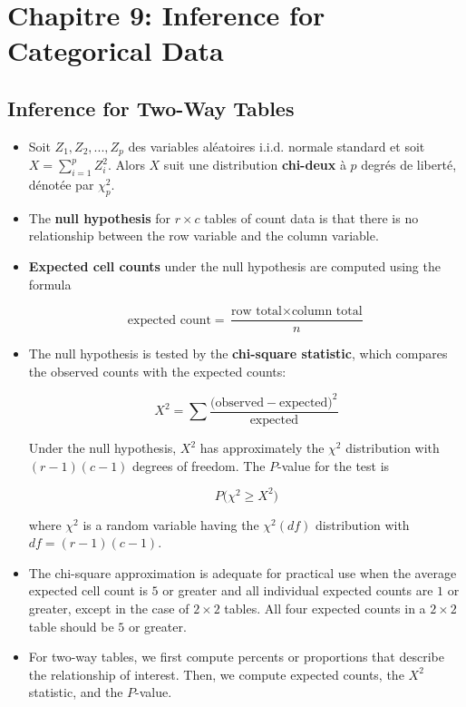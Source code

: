 \section{Chapitre 9: Inference for Categorical Data}
	\subsection{Inference for Two-Way Tables}
		\begin{itemize}
			\item Soit $Z_1,Z_2,...,Z_p$ des variables aléatoires i.i.d. normale standard et soit $X=\sum_{i=1}^{p}Z^2_i$. Alors $X$ suit une distribution \textbf{chi-deux} à $p$ degrés de liberté, dénotée par $\chi^2_p$.
			\item The \textbf{null hypothesis} for $r\times c$ tables of count data is that there is no relationship between the row variable and the column variable.
			
			\item \textbf{Expected cell counts} under the null hypothesis are computed using the formula
			
			\[\text{expected count} = \frac{\text{row total}\times\text{column total}}{n}\]
			
			\item The null hypothesis is tested by the \textbf{chi-square statistic}, which compares the observed counts with the expected counts:
			
			\[X^2=\sum \frac{\big(\text{observed}-\text{expected}\big)^2}{\text{expected}}\]
			
			Under the null hypothesis, $X^2$ has approximately the $\chi^2$ distribution with $(r-1)(c-1)$ degrees of freedom. The $P$-value for the test is
			
			\[P \Big(\chi^2\geq X^2\Big)\]
			
			where $\chi^2$ is a random variable having the $\chi^2 (df)$ distribution with
			$df=(r-1)(c-1)$.
			
			\item The chi-square approximation is adequate for practical use when the average expected cell count is $5$ or greater and all individual expected counts are $1$ or greater, except in the case of $2\times2$ tables. All four expected counts in a $2\times2$ table should be $5$ or greater.
			
			\item For two-way tables, we first compute percents or proportions that describe the relationship of interest. Then, we compute expected counts, the $X^2$ statistic, and the $P$-value.
			

\end{itemize}
